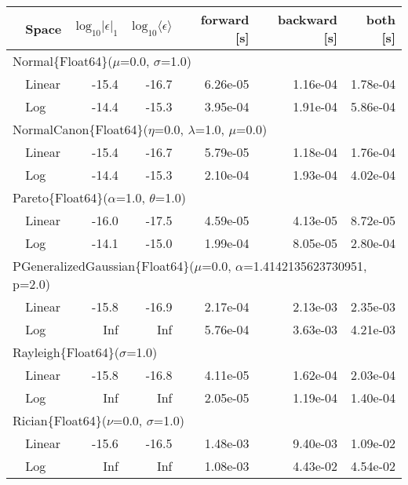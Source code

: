 \begin{tabular}{|llrrrrr|} \hline
& Space & $\mbox{log}_{10}|\epsilon|_1$ & $\mbox{log}_{10}\langle\epsilon\rangle$ & forward [s] & backward [s] & both [s]\\ \hline
\multicolumn{7}{|l|}{Normal\{Float64\}($\mu$=0.0, $\sigma$=1.0)}\\ \hline
& Linear & {\color{blue}-15.4} & {\color{blue}-16.7} & {\color{blue}6.26e-05} & {\color{blue}1.16e-04} & {\color{blue}1.78e-04}\\
& Log & -14.4 & -15.3 & 3.95e-04 & 1.91e-04 & 5.86e-04\\
\hline
\multicolumn{7}{|l|}{NormalCanon\{Float64\}($\eta$=0.0, $\lambda$=1.0, $\mu$=0.0)}\\ \hline
& Linear & {\color{blue}-15.4} & {\color{blue}-16.7} & {\color{blue}5.79e-05} & {\color{blue}1.18e-04} & {\color{blue}1.76e-04}\\
& Log & -14.4 & -15.3 & 2.10e-04 & 1.93e-04 & 4.02e-04\\
\hline
\multicolumn{7}{|l|}{Pareto\{Float64\}($\alpha$=1.0, $\theta$=1.0)}\\ \hline
& Linear & {\color{blue}-16.0} & {\color{blue}-17.5} & {\color{blue}4.59e-05} & {\color{blue}4.13e-05} & {\color{blue}8.72e-05}\\
& Log & -14.1 & -15.0 & 1.99e-04 & 8.05e-05 & 2.80e-04\\
\hline
\multicolumn{7}{|l|}{PGeneralizedGaussian\{Float64\}($\mu$=0.0, $\alpha$=1.4142135623730951, p=2.0)}\\ \hline
& Linear & {\color{blue}-15.8} & {\color{blue}-16.9} & {\color{blue}2.17e-04} & {\color{blue}2.13e-03} & {\color{blue}2.35e-03}\\
& Log & Inf & Inf & 5.76e-04 & 3.63e-03 & 4.21e-03\\
\hline
\multicolumn{7}{|l|}{Rayleigh\{Float64\}($\sigma$=1.0)}\\ \hline
& Linear & {\color{blue}-15.8} & {\color{blue}-16.8} & 4.11e-05 & 1.62e-04 & 2.03e-04\\
& Log & Inf & Inf & {\color{blue}2.05e-05} & {\color{blue}1.19e-04} & {\color{blue}1.40e-04}\\
\hline
\multicolumn{7}{|l|}{Rician\{Float64\}($\nu$=0.0, $\sigma$=1.0)}\\ \hline
& Linear & {\color{blue}-15.6} & {\color{blue}-16.5} & 1.48e-03 & {\color{blue}9.40e-03} & {\color{blue}1.09e-02}\\
& Log & Inf & Inf & {\color{blue}1.08e-03} & 4.43e-02 & 4.54e-02\\

\end{tabular}
